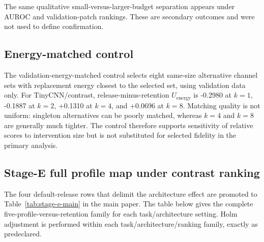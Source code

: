 The same qualitative small-versus-larger-budget separation appears under AUROC and validation-patch rankings. These are secondary outcomes and were not used to define confirmation.

\subsection{Energy-matched control}\label{app:energy-control}

The validation-energy-matched control selects eight same-size alternative channel sets with replacement energy closest to the selected set, using validation data only. For TinyCNN/contrast, release-minus-retention $U_{\mathrm{energy}}$ is -0.2980 at $k=1$, -0.1887 at $k=2$, +0.1310 at $k=4$, and +0.0696 at $k=8$. Matching quality is not uniform: singleton alternatives can be poorly matched, whereas $k=4$ and $k=8$ are generally much tighter. The control therefore supports sensitivity of relative scores to intervention size but is not substituted for selected fidelity in the primary analysis.

\subsection{Stage-E full profile map under contrast ranking}\label{app:stage-e-profiles}

The four default-release rows that delimit the architecture effect are promoted to Table~\ref{tab:stage-e-main} in the main paper. The table below gives the complete five-profile-versus-retention family for each task/architecture setting. Holm adjustment is performed within each task/architecture/ranking family, exactly as predeclared.

